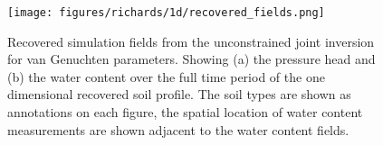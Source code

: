 \begin{figure}[!htbp]
\begin{center}
\texttt{[image: figures/richards/1d/recovered\_fields.png]}
\end{center}
\caption{
Recovered simulation fields from the unconstrained joint inversion for van Genuchten parameters.
Showing (a) the pressure head and (b) the water content over the full time period of the one dimensional recovered soil profile.
The soil types are shown as annotations on each figure, the spatial location of water content measurements
are shown adjacent to the water content fields.
}
\label{fig:richards-1d-recovered_fields}
\end{figure}
